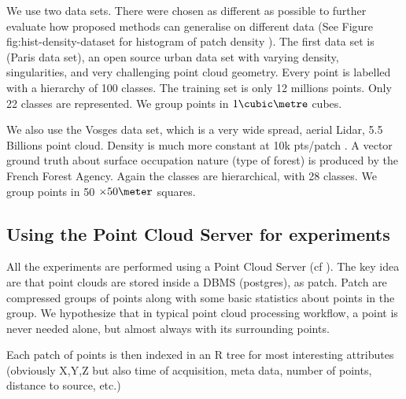 	
 		We use two data sets. There were chosen as different as possible to further evaluate how proposed methods can generalise on different data (See Figure fig:hist-density-dataset for histogram of patch density ). 
 		The first data set is \cite{IQmulus2014} (Paris data set), an open source urban data set with varying density, singularities, and very challenging point cloud geometry. 
 		Every point is labelled with a hierarchy of 100 classes.
 		The training set is only 12 millions points.
 		Only 22 classes are represented. We group points in $1 \cubic \metre$ cubes.
 		
 		We also use the Vosges data set, which is a very wide spread, aerial Lidar, 5.5 Billions point cloud. 
 		Density is much more constant at 10k pts/patch .
 		A vector ground truth about surface occupation nature (type of forest) is produced by the French Forest Agency. Again the classes are hierarchical, with 28 classes. 
 		We group points in 50 $\times 50 \meter$ squares.
 		

	\subsection{Using the Point Cloud Server for experiments}
		All the experiments are performed using a Point Cloud Server (cf \cite{Cura2014}).
		The key idea are that point clouds are stored inside a DBMS (postgres), as patch. Patch are compressed groups of points along with some basic statistics about points in the group.
		We hypothesize that in typical point cloud processing workflow, a point is never needed alone, but almost always with its surrounding points.
	
		Each patch of points is then indexed in an R tree for most interesting attributes (obviously X,Y,Z but also time of acquisition, meta data, number of points, distance to source, etc.)
			
